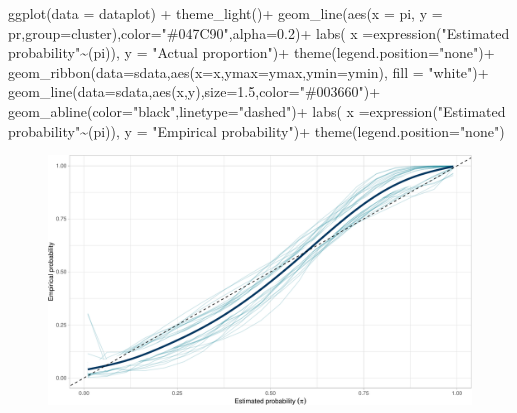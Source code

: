 \documentclass[
  letterpaper,
  DIV=11,
  numbers=noendperiod]{scrartcl}
\newenvironment{Shaded}{\begin{snugshade}}{\end{snugshade}}
\newcommand{\AttributeTok}[1]{\textcolor[rgb]{0.65,0.35,0.00}{#1}}
\newcommand{\FloatTok}[1]{\textcolor[rgb]{0.65,0.35,0.00}{#1}}
\newcommand{\FunctionTok}[1]{\textcolor[rgb]{0.02,0.16,0.49}{#1}}
\newcommand{\NormalTok}[1]{\textcolor[rgb]{0.33,0.33,0.33}{#1}}
\newcommand{\SpecialCharTok}[1]{\textcolor[rgb]{0.00,0.46,0.62}{#1}}
\newcommand{\StringTok}[1]{\textcolor[rgb]{0.00,0.50,0.00}{#1}}
\begin{document}
\begin{Shaded}
\begin{Highlighting}[]
\FunctionTok{ggplot}\NormalTok{(}\AttributeTok{data =}\NormalTok{ dataplot) }\SpecialCharTok{+}
  \FunctionTok{theme\_light}\NormalTok{()}\SpecialCharTok{+}
    \FunctionTok{geom\_line}\NormalTok{(}\FunctionTok{aes}\NormalTok{(}\AttributeTok{x =}\NormalTok{ pi, }\AttributeTok{y =}\NormalTok{ pr,}\AttributeTok{group=}\NormalTok{cluster),}\AttributeTok{color=}\StringTok{"\#047C90"}\NormalTok{,}\AttributeTok{alpha=}\FloatTok{0.2}\NormalTok{)}\SpecialCharTok{+}
  \FunctionTok{labs}\NormalTok{( }\AttributeTok{x =}\FunctionTok{expression}\NormalTok{(}\StringTok{"Estimated probability"}\SpecialCharTok{\textasciitilde{}}\NormalTok{(pi)),}
        \AttributeTok{y =} \StringTok{"Actual proportion"}\NormalTok{)}\SpecialCharTok{+}
  \FunctionTok{theme}\NormalTok{(}\AttributeTok{legend.position=}\StringTok{"none"}\NormalTok{)}\SpecialCharTok{+}
  \FunctionTok{geom\_ribbon}\NormalTok{(}\AttributeTok{data=}\NormalTok{sdata,}\FunctionTok{aes}\NormalTok{(}\AttributeTok{x=}\NormalTok{x,}\AttributeTok{ymax=}\NormalTok{ymax,}\AttributeTok{ymin=}\NormalTok{ymin), }\AttributeTok{fill =} \StringTok{"white"}\NormalTok{)}\SpecialCharTok{+}
  \FunctionTok{geom\_line}\NormalTok{(}\AttributeTok{data=}\NormalTok{sdata,}\FunctionTok{aes}\NormalTok{(x,y),}\AttributeTok{size=}\FloatTok{1.5}\NormalTok{,}\AttributeTok{color=}\StringTok{"\#003660"}\NormalTok{)}\SpecialCharTok{+}
  \FunctionTok{geom\_abline}\NormalTok{(}\AttributeTok{color=}\StringTok{"black"}\NormalTok{,}\AttributeTok{linetype=}\StringTok{"dashed"}\NormalTok{)}\SpecialCharTok{+}
   \FunctionTok{labs}\NormalTok{( }\AttributeTok{x =}\FunctionTok{expression}\NormalTok{(}\StringTok{"Estimated probability"}\SpecialCharTok{\textasciitilde{}}\NormalTok{(pi)),}
        \AttributeTok{y =} \StringTok{"Empirical probability"}\NormalTok{)}\SpecialCharTok{+}
  \FunctionTok{theme}\NormalTok{(}\AttributeTok{legend.position=}\StringTok{"none"}\NormalTok{)}
\end{Highlighting}
\end{Shaded}

\begin{figure}[H]

{\centering \includegraphics{index_files/figure-pdf/unnamed-chunk-4-1.pdf}

}

\end{figure}
\end{document}
